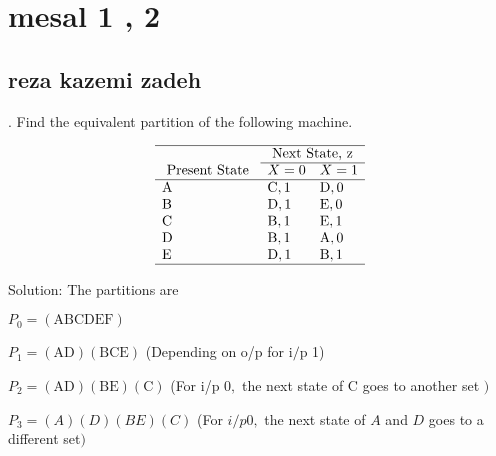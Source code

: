 \documentclass [7pt]{beamer}
\begin{document}
\small
\section*{mesal 1 , 2}
\subsection*{reza kazemi zadeh }	
\begin{frame}
. Find the equivalent partition of the following machine.

$$\begin{array}{lll}
\hline & \multicolumn{2}{l} {\text { Next State, } \mathrm{z}} \\
\cline { 2 - 3 } \text { Present State } & X=0 & X= 1 \\
\hline \mathrm{A} & \mathrm{C}, 1 & \mathrm{D}, 0 \\
\mathrm{B} & \mathrm{D}, 1 & \mathrm{E}, 0 \\
\mathrm{C} & \mathrm{B}, 1 & \mathrm{E}, 1 \\
\mathrm{D} & \mathrm{B}, 1 & \mathrm{A}, 0 \\
\mathrm{E} & \mathrm{D}, 1 & \mathrm{B}, 1 \\
\hline
\end{array}$$


Solution: The partitions are

 
$P_{0}=(\mathrm{ABCDEF})$


$P_{1}=(\mathrm{AD})(\mathrm{BCE})$ (Depending on o/p for $\mathrm{i} / \mathrm{p}$ 1)


$P_{2}=(\mathrm{AD})(\mathrm{BE})(\mathrm{C})$ (For i/p $0,$ the next state of $\mathrm{C}$ goes to another set $)$ 


$P_{3}=(A)(D)(B E)(C)$ (For $i / p 0,$ the next state of $A$ and $D$ goes to a different set$)$
\end{frame}
\end{document}
